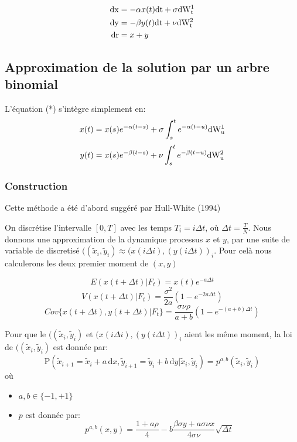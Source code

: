 \begin{align*}
  \rm{d}x &= -\alpha x(t) \rm{d}t + \sigma \rm{d}W^1_t \\
  \rm{d}y &= -\beta y(t) \rm{d}t + \nu \rm{d}W^2_t \\
  \rm{d}r &= x + y 
\end{align*}

\newpage
\subsection{Approximation de la solution par un arbre binomial}


L'équation (*) s'intègre simplement en:
$$x(t) = x(s) e^{-\alpha (t-s)} +  \sigma \int_s^t e^{- \alpha (t-u)} \rm{d} W^1_u $$
$$y(t) = x(s) e^{-\beta (t-s)} +  \nu \int_s^t e^{- \beta (t-u)} \rm{d} W^2_u $$

\subsubsection{Construction}

Cette méthode a été d'abord suggéré par Hull-White (1994)

On discrétise l’intervalle $[0, T]$ avec les temps $T_i = i \Delta t$, où $\Delta t = \frac{T}{N}$.
Nous donnons une approximation de la dynamique processus $x$ et $y$, par une suite de variable de discretisé $((\widetilde{x}_i, \widetilde{y}_i) \approx (x(i \Delta i), (y(i \Delta t))_i $. Pour celà nous calculerons les deux premier moment de $(x, y)$

$$E(x(t+\Delta t) | F_t) = x(t) e^{-a \Delta t}$$
$$V(x(t+\Delta t) | F_t) = \frac{\sigma^2}{2a} (1 - e^{-2a \Delta t})$$
$$Cov\{x(t+\Delta t), y(t+\Delta t) | F_t \} = \frac{\sigma \nu \rho}{a + b} (1-e^{-(a+b)\Delta t})$$

Pour que le $((\widetilde{x}_i, \widetilde{y}_i)$ et $(x(i \Delta i), (y(i \Delta t))_i $ aient les même moment, la loi de  $((\widetilde{x}_i, \widetilde{y}_i)$  est donnée par:
$$\mathrm{P} \left( \widetilde{x}_{i+1} = \widetilde{x}_i + a \, \mathrm{d}x, \widetilde{y}_{i+1} = \widetilde{y}_i + b \, \mathrm{d}y |  \widetilde{x}_i, \widetilde{y}_i \right) = p^{a, b}( \widetilde{x}_i, \widetilde{y}_i)$$
où 
\begin{itemize}
\item $a, b \in \{-1, +1\}$
\item $p$ est donnée par:
$$ p^{a, b}(x, y) = \frac{1 + a \rho}{4} - b \frac{\beta \sigma y + a \sigma \nu  x}{4 \sigma \nu} \sqrt{\Delta t} $$
\end{itemize}

